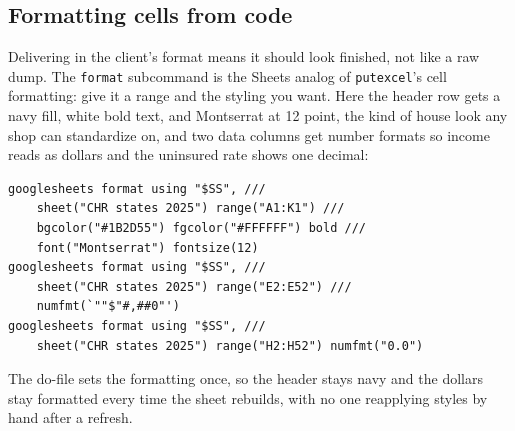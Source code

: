\subsection{Formatting cells from code}
Delivering in the client's format means it should look finished, not like a raw dump. The \texttt{format} subcommand is the Sheets analog of \texttt{putexcel}'s cell formatting: give it a range and the styling you want. Here the header row gets a navy fill, white bold text, and Montserrat at 12 point, the kind of house look any shop can standardize on, and two data columns get number formats so income reads as dollars and the uninsured rate shows one decimal:
\par
{\footnotesize
\begin{verbatim}
googlesheets format using "$SS", ///
    sheet("CHR states 2025") range("A1:K1") ///
    bgcolor("#1B2D55") fgcolor("#FFFFFF") bold ///
    font("Montserrat") fontsize(12)
googlesheets format using "$SS", ///
    sheet("CHR states 2025") range("E2:E52") ///
    numfmt(`""$"#,##0"')
googlesheets format using "$SS", ///
    sheet("CHR states 2025") range("H2:H52") numfmt("0.0")
\end{verbatim}
}
The do-file sets the formatting once, so the header stays navy and the dollars stay formatted every time the sheet rebuilds, with no one reapplying styles by hand after a refresh.

